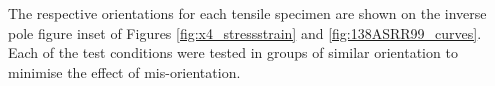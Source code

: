 \documentclass[a4paper,12pt,times,numbered,print,index]{Classes/PhDThesisPSnPDF}
\begin{document}
The respective orientations for each tensile specimen are shown on the inverse pole figure inset of Figures \ref{fig:x4_stressstrain} and \ref{fig:138ASRR99_curves}. Each of the test conditions were tested in groups of similar orientation to minimise the effect of mis-orientation.\\ %
\end{document}

